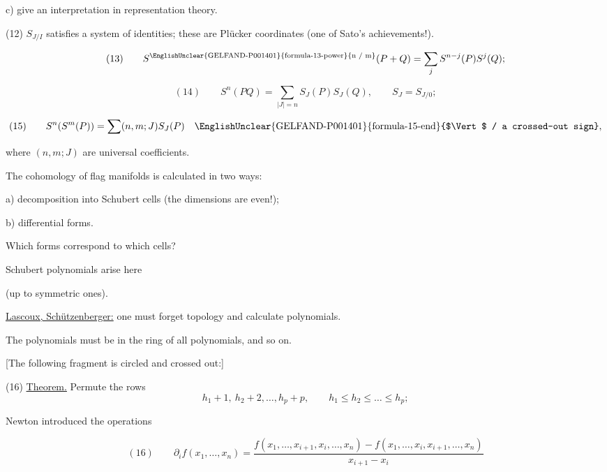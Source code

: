 c) give an interpretation in representation theory.

(12) $S_{J/I}$ satisfies a system of identities;
these are Pl\"ucker coordinates (one of Sato's achievements!).

\begin{equation*}
(13)\qquad
S^{\text{\EnglishUnclear{GELFAND-P001401}{formula-13-power}{n / m}}}(P+Q)
=\sum_j S^{n-j}(P)S^j(Q);
\end{equation*}

\begin{equation*}
(14)\qquad
S^n(PQ)=\sum_{|J|=n}S_J(P)S_J(Q),\qquad S_J=S_{J/0};
\end{equation*}

\begin{equation*}
(15)\qquad
S^n(S^m(P))=\sum(n,m;J)S_J(P)
\quad\text{\EnglishUnclear{GELFAND-P001401}{formula-15-end}{$\Vert$ / a crossed-out sign}},
\end{equation*}

where $(n,m;J)$ are universal coefficients.

The cohomology of flag manifolds is calculated in two ways:

a) decomposition into Schubert cells (the dimensions are even!);

b) differential forms.

Which forms correspond to which cells?

Schubert polynomials arise here

(up to symmetric ones).

\underline{Lascoux, Sch\"utzenberger:} one must forget topology and calculate polynomials.

The polynomials must be 
in the ring of all polynomials, and so on.



[The following fragment is circled and crossed out:]

(16) \underline{Theorem.} Permute the rows
\begin{equation*}
h_1+1,\ h_2+2,\ldots,h_p+p,\qquad h_1\le h_2\le\ldots\le h_p;
\end{equation*}

Newton introduced the operations

\begin{equation*}
(16)\qquad
\partial_i f(x_1,\ldots,x_n)=
\frac{f(x_1,\ldots,x_{i+1},x_i,\ldots,x_n)-f(x_1,\ldots,x_i,x_{i+1},\ldots,x_n)}{x_{i+1}-x_i}
\end{equation*}


